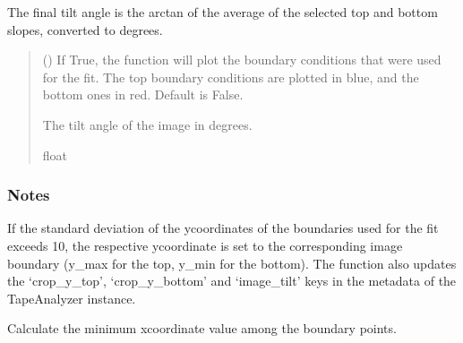 \documentclass[letterpaper,10pt,english]{sphinxmanual}
\begin{document}
\begin{fulllineitems}
\begin{fulllineitems}
\sphinxAtStartPar
The final tilt angle is the arctan of the average of the selected top and bottom slopes, converted to degrees.
\begin{quote}\begin{description}
\sphinxAtStartPar
{}

\sphinxAtStartPar
{} (\sphinxstyleliteralemphasis{\sphinxupquote{, }}) \textendash{} If True, the function will plot the boundary conditions that were used for the fit.
The top boundary conditions are plotted in blue, and the bottom ones in red. Default is False.

\sphinxAtStartPar
The tilt angle of the image in degrees.

\sphinxAtStartPar
float

\end{description}\end{quote}
\subsubsection*{Notes}

\sphinxAtStartPar
If the standard deviation of the y\sphinxhyphen{}coordinates of the boundaries used for the fit exceeds 10,
the respective y\sphinxhyphen{}coordinate is set to the corresponding image boundary (y\_max for the top, y\_min for the bottom).
The function also updates the ‘crop\_y\_top’, ‘crop\_y\_bottom’ and ‘image\_tilt’ keys in the metadata of the TapeAnalyzer instance.

\end{fulllineitems}


\begin{fulllineitems}
\label{\detokenize{forensicfit.core.tape:forensicfit.core.tape.TapeAnalyzer.xmin}}
\pysigstartsignatures
{}
\pysigstopsignatures
\sphinxAtStartPar
Calculate the minimum x\sphinxhyphen{}coordinate value among the boundary points.


\end{fulllineitems}
\end{fulllineitems}
\end{document}
